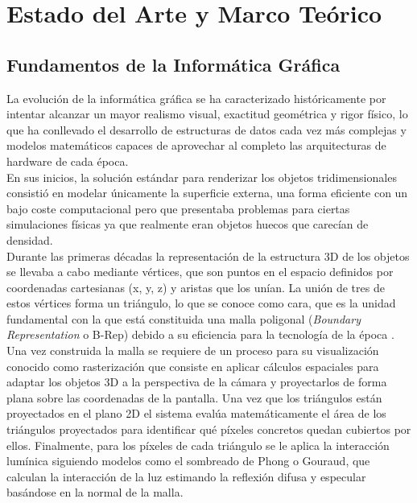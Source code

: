 \chapter{Estado del Arte y Marco Teórico}

\section[Fundamentos de la Informática Gráfica]{Fundamentos de la Informática Gráfica}
        
    La evolución de la informática gráfica se ha caracterizado históricamente por intentar alcanzar un mayor realismo visual, exactitud geométrica y rigor físico, lo que ha conllevado el desarrollo de estructuras de datos cada vez más complejas y modelos matemáticos capaces de aprovechar al completo las arquitecturas de hardware de cada época.\\

    En sus inicios, la solución estándar para renderizar los objetos tridimensionales consistió en modelar únicamente la superficie externa, una forma eficiente con un bajo coste computacional pero que presentaba problemas para ciertas simulaciones físicas ya que realmente eran objetos huecos que carecían de densidad.\\

    Durante las primeras décadas la representación de la estructura 3D de los objetos se llevaba a cabo mediante vértices, que son puntos en el espacio definidos por coordenadas cartesianas (x, y, z) y aristas que los unían. La unión de tres de estos vértices forma un triángulo, lo que se conoce como cara, que es la unidad fundamental con la que está constituida una malla poligonal (\textit{Boundary Representation} o B-Rep) debido a su eficiencia para la tecnología de la época \cite{foley2014computer}.\\

    Una vez construida la malla se requiere de un proceso para su visualización conocido como rasterización que consiste en aplicar cálculos espaciales para adaptar los objetos 3D a la perspectiva de la cámara y proyectarlos de forma plana sobre las coordenadas de la pantalla. Una vez que los triángulos están proyectados en el plano 2D el sistema evalúa matemáticamente el área de los triángulos proyectados para identificar qué píxeles concretos quedan cubiertos por ellos. Finalmente, para los píxeles de cada triángulo se le aplica la interacción lumínica siguiendo modelos como el sombreado de Phong o Gouraud, que calculan la interacción de la luz estimando la reflexión difusa y especular basándose en la normal de la malla. \\
    
